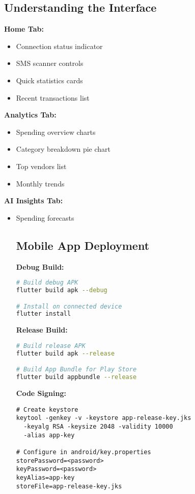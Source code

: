 \documentclass[11pt,a4paper]{report}
\begin{document}
\begin{itemize}
\subsection{Understanding the Interface}

\textbf{Home Tab:}
\begin{itemize}
    \item Connection status indicator
    \item SMS scanner controls
    \item Quick statistics cards
    \item Recent transactions list
\end{itemize}

\textbf{Analytics Tab:}
\begin{itemize}
    \item Spending overview charts
    \item Category breakdown pie chart
    \item Top vendors list
    \item Monthly trends
\end{itemize}

\textbf{AI Insights Tab:}
\begin{itemize}
    \item Spending forecasts\subsection{Mobile App Deployment}

\textbf{Debug Build:}
\begin{lstlisting}[language=bash]
# Build debug APK
flutter build apk --debug

# Install on connected device
flutter install
\end{lstlisting}

\textbf{Release Build:}
\begin{lstlisting}[language=bash]
# Build release APK
flutter build apk --release

# Build App Bundle for Play Store
flutter build appbundle --release
\end{lstlisting}

\textbf{Code Signing:}
\begin{lstlisting}
# Create keystore
keytool -genkey -v -keystore app-release-key.jks 
  -keyalg RSA -keysize 2048 -validity 10000 
  -alias app-key

# Configure in android/key.properties
storePassword=<password>
keyPassword=<password>
keyAlias=app-key
storeFile=app-release-key.jks
\end{lstlisting}


\end{itemize}
\end{itemize}
\end{document}
